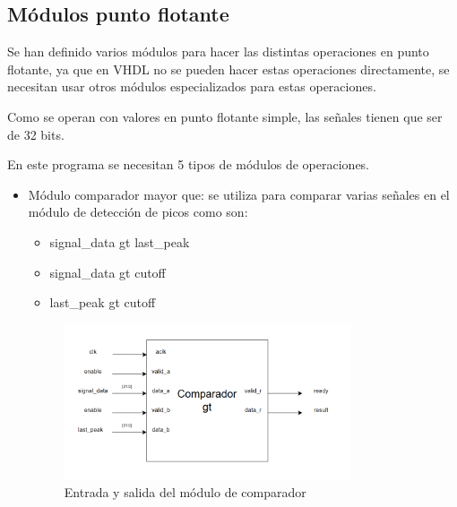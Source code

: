 \subsection{Módulos punto flotante}

Se han definido varios módulos para hacer las distintas operaciones en punto flotante, ya que en VHDL no se
pueden hacer estas operaciones directamente, se necesitan usar otros módulos especializados para estas operaciones.

Como se operan con valores en punto flotante simple, las señales tienen que ser de 32 bits.

En este programa se necesitan 5 tipos de módulos de operaciones.

\begin{itemize}
    \item Módulo comparador mayor que: se utiliza para comparar varias señales en el módulo de detección de picos como son:
    \begin{itemize}
        \item signal\_data gt last\_peak
        \item signal\_data gt cutoff
        \item last\_peak gt cutoff
    \end{itemize}

    \begin{figure}[h!]
        \centering
        \includegraphics[width=0.8\textwidth]{./Images/img_implementacion_hw/comparadorgt.png}
        \caption{Entrada y salida del módulo de comparador}
        \label{fig:comparadorgt}
    \end{figure}


\end{itemize}
